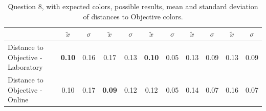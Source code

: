 \begin{table}[H]
{\begin{tabular}{lccccccccccccc}
                                                      & \multicolumn{1}{l}{}                 & \multicolumn{1}{l}{}     & \multicolumn{1}{l}{}       & \multicolumn{1}{c}{$\tilde{x}$} & \multicolumn{1}{c}{$\sigma$} & \multicolumn{1}{c}{$\tilde{x}$} & \multicolumn{1}{c}{$\sigma$} & \multicolumn{1}{c}{$\tilde{x}$} & \multicolumn{1}{c}{$\sigma$} & \multicolumn{1}{c}{$\tilde{x}$} & \multicolumn{1}{c}{$\sigma$} & \multicolumn{1}{c}{$\tilde{x}$} & \multicolumn{1}{c}{$\sigma$} \\ \hline
    \multicolumn{4}{l}{Distance to Objective - Laboratory}                                                                                           & \multicolumn{1}{|c}{\textbf{0.10}}       & \multicolumn{1}{c|}{0.16}    & \multicolumn{1}{|c}{0.17}       & \multicolumn{1}{c|}{0.13}    & \multicolumn{1}{|c}{\textbf{0.10}}       & \multicolumn{1}{c|}{0.05}    & \multicolumn{1}{|c}{0.13}       & \multicolumn{1}{c|}{0.09}    & \multicolumn{1}{|c}{0.13}       & \multicolumn{1}{c|}{0.09}    \\
    \multicolumn{4}{l}{Distance to Objective - Online}                                                                                               & \multicolumn{1}{|c}{0.10}        & \multicolumn{1}{c|}{0.17}    & \multicolumn{1}{|c}{\textbf{0.09}}        & \multicolumn{1}{c|}{0.12}    & \multicolumn{1}{|c}{0.12}       & \multicolumn{1}{c|}{0.05}    & \multicolumn{1}{|c}{0.14}        & \multicolumn{1}{c|}{0.07}    & \multicolumn{1}{|c}{0.16}       & \multicolumn{1}{c|}{0.07}    \\ \hline
    \end{tabular}}
  \caption[Question 8, with expected Results.]{Question 8, with expected colors, possible results, mean and standard deviation of distances to Objective colors.}
  \label{table:lab_q8_expected}
\end{table}
%
